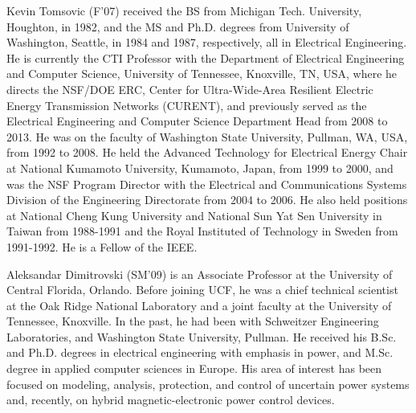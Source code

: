 \documentclass[journal]{IEEEtran}
\begin{document}
\begin{IEEEbiographynophoto}{Kevin Tomsovic}
	(F'07) received the BS from Michigan Tech. University, Houghton, in 1982, and the MS and Ph.D. degrees from University of Washington, Seattle, in 1984 and 1987, respectively, all in Electrical Engineering. He is currently the CTI Professor with the Department of Electrical Engineering and Computer Science, University of Tennessee, Knoxville, TN, USA, where he directs the NSF/DOE ERC, Center for Ultra-Wide-Area Resilient Electric Energy Transmission Networks (CURENT),  and previously served as the Electrical Engineering and Computer  Science Department  Head  from 2008  to  2013.  He was on  the  faculty of Washington State University, Pullman, WA, USA, from 1992 to 2008. He held the Advanced Technology for Electrical Energy Chair at National Kumamoto University, Kumamoto, Japan, from  1999 to 2000, and  was the NSF Program  Director with  the Electrical and Communications Systems Division of the Engineering Directorate from 2004 to 2006. He also held positions at National Cheng Kung University and National Sun Yat Sen University in Taiwan from 1988-1991 and the Royal Instituted of Technology in Sweden from 1991-1992. He is a Fellow of the IEEE.
\end{IEEEbiographynophoto}

\begin{IEEEbiographynophoto}{Aleksandar Dimitrovski}
	(SM'09) is an Associate Professor at the University of Central Florida, Orlando. Before joining UCF, he was a chief technical scientist at the Oak Ridge National
	Laboratory and a joint faculty at the University of Tennessee, Knoxville. In the past, he had been with Schweitzer Engineering Laboratories, and Washington State University, Pullman. He received his B.Sc. and Ph.D. degrees in electrical engineering with emphasis in power, and M.Sc. degree in applied computer sciences in Europe. His area of interest has been focused on modeling, analysis, protection, and control of uncertain power systems and, recently, on hybrid magnetic-electronic power control devices.
\end{IEEEbiographynophoto}

\end{document}
